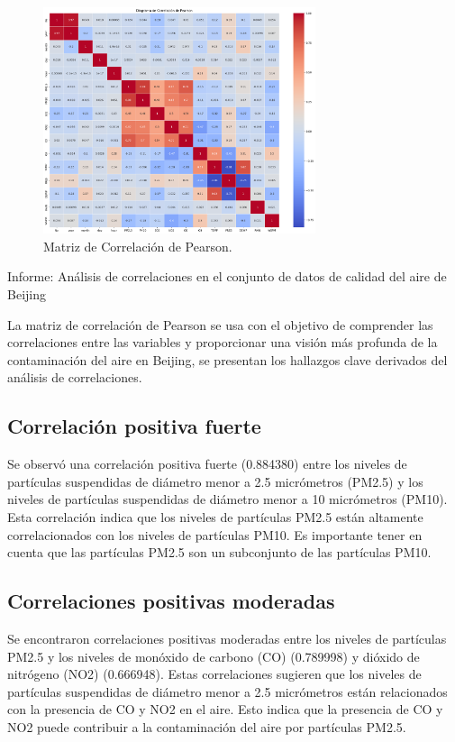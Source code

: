 \begin{figure}[htb] 
    \begin{center} 
        \includegraphics[width=8cm]{Papper IB/Images/correlation_matrix.png}
    \end{center} 
    \caption{Matriz de Correlación de Pearson.} 
    \label{fig:fig1} 
\end{figure} 

Informe: Análisis de correlaciones en el conjunto de datos de calidad del aire de Beijing

La matriz de correlación de Pearson se usa con el objetivo de comprender las correlaciones entre las variables y proporcionar una visión más profunda de la contaminación del aire en Beijing, se presentan los hallazgos clave derivados del análisis de correlaciones.

\subsection{\textbf{Correlación positiva fuerte}}
Se observó una correlación positiva fuerte (0.884380) entre los niveles de partículas suspendidas de diámetro menor a 2.5 micrómetros (PM2.5) y los niveles de partículas suspendidas de diámetro menor a 10 micrómetros (PM10). Esta correlación indica que los niveles de partículas PM2.5 están altamente correlacionados con los niveles de partículas PM10. Es importante tener en cuenta que las partículas PM2.5 son un subconjunto de las partículas PM10.

\subsection{\textbf{Correlaciones positivas moderadas}}
Se encontraron correlaciones positivas moderadas entre los niveles de partículas PM2.5 y los niveles de monóxido de carbono (CO) (0.789998) y dióxido de nitrógeno (NO2) (0.666948). Estas correlaciones sugieren que los niveles de partículas suspendidas de diámetro menor a 2.5 micrómetros están relacionados con la presencia de CO y NO2 en el aire. Esto indica que la presencia de CO y NO2 puede contribuir a la contaminación del aire por partículas PM2.5.

